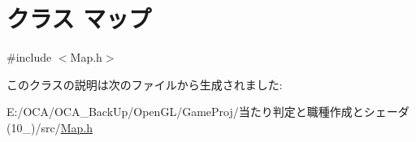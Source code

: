 \hypertarget{class_xE3_x83_x9E_xE3_x83_x83_xE3_x83_x97}{\section{クラス マップ}
\label{class_xE3_x83_x9E_xE3_x83_x83_xE3_x83_x97}
}


{\ttfamily \#include $<$Map.\-h$>$}



このクラスの説明は次のファイルから生成されました\-:\begin{DoxyCompactItemize}
\item 
E\-:/\-O\-C\-A/\-O\-C\-A\-\_\-\-Back\-Up/\-Open\-G\-L/\-Game\-Proj/当たり判定と職種作成とシェーダ(10\-\_)/src/\hyperlink{_map_8h}{Map.\-h}\end{DoxyCompactItemize}
